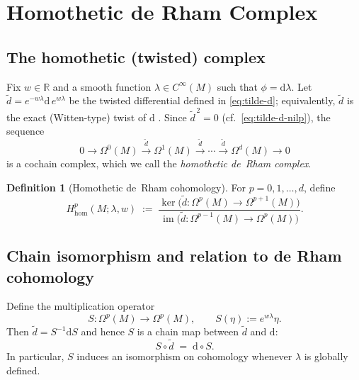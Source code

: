 \documentclass[preprint,12pt]{elsarticle}
\theoremstyle{plain}
\theoremstyle{definition}
\newtheorem{definition}[theorem]{Definition}
\theoremstyle{note}
\newcommand{\R}{\mathbb{R}}
\newcommand{\dd}{\mathrm{d}}
\newcommand{\wtd}{\tilde d}
\begin{document}
\section{Homothetic de Rham Complex} \label{sec:homothetic-derham}


\subsection{The homothetic (twisted) complex}

Fix $w\in\R$ and a smooth function $\lambda\in C^\infty(M)$ such that $\phi=\dd\lambda$.
Let $\wtd=e^{-w\lambda}\dd\, e^{w\lambda}$ be the twisted differential defined in \eqref{eq:tilde-d};
equivalently, $\wtd$ is the exact (Witten-type) twist of $\dd$ \cite{Witten1982}.
Since $\wtd^{\,2}=0$ (cf.\ \eqref{eq:tilde-d-nilp}), the sequence
\begin{equation}\label{eq:homothetic-complex}
0 \longrightarrow \Omega^0(M)\xrightarrow{\ \wtd\ }\Omega^1(M)\xrightarrow{\ \wtd\ }\cdots
\xrightarrow{\ \wtd\ }\Omega^d(M)\longrightarrow 0
\end{equation}
is a cochain complex, which we call the \emph{homothetic de~Rham complex}.

\begin{definition}[Homothetic de~Rham cohomology]\label{def:hom-cohom}
For $p=0,1,\dots,d$, define
\begin{equation}\label{eq:hom-cohom}
H^p_{\mathrm{hom}}(M;\lambda,w)
\;:=\;
\frac{\ker\big(\wtd:\Omega^p(M)\to\Omega^{p+1}(M)\big)}
     {\operatorname{im}\big(\wtd:\Omega^{p-1}(M)\to\Omega^{p}(M)\big)}.
\end{equation}
\end{definition}

\subsection{Chain isomorphism and relation to de Rham cohomology}
Define the multiplication operator
\begin{equation}\label{eq:S-operator}
S:\Omega^p(M)\to\Omega^p(M),\qquad S(\eta):=e^{w\lambda}\eta.
\end{equation}
Then $\wtd=S^{-1}\dd S$ and hence $S$ is a chain map between $\wtd$ and $\dd$:
\begin{equation}\label{eq:chain-map}
\boxed{
S\circ \wtd \;=\; \dd \circ S.}
\end{equation}
In particular, $S$ induces an isomorphism on cohomology whenever $\lambda$ is globally defined.
\end{document}
